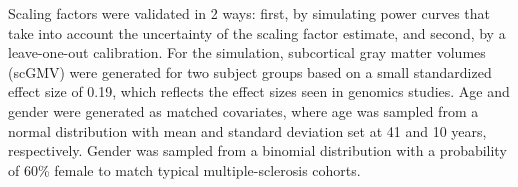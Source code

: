 Scaling factors were validated in 2 ways: first, by simulating power curves that take into account the uncertainty of the scaling factor estimate, and second, by a leave-one-out calibration. For the simulation, subcortical gray matter volumes (scGMV) were generated for two subject groups based on a small standardized effect size of 0.19, which reflects the effect sizes seen in genomics studies. Age and gender were generated as matched covariates, where age was sampled from a normal distribution with mean and standard deviation set at 41 and 10 years, respectively. Gender was sampled from a binomial distribution with a probability of 60\% female to match typical multiple-sclerosis cohorts. %
